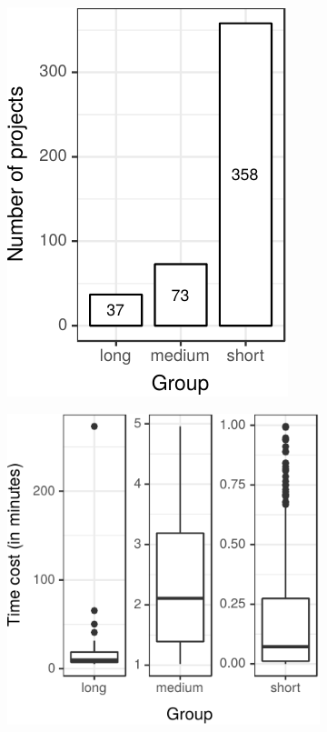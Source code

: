 \begin{figure}[ht]
  \centering
  \begin{subfigure}{0.182\textwidth}
    \centering
    \includegraphics[width=\textwidth]{results/barplot-timecost.pdf}
    \caption{\label{fig:rq1-barplot}}
  \end{subfigure}%
  \hfill
  \begin{subfigure}{0.25\textwidth}
    \centering
    \includegraphics[width=\textwidth]{results/boxplot-timecost.pdf}

\end{subfigure}
\end{figure}
